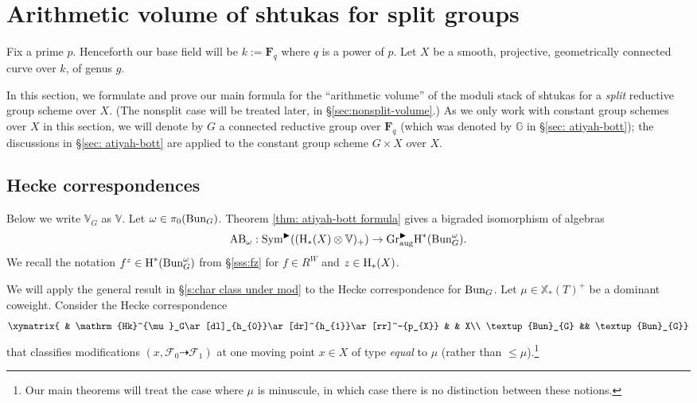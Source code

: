 \documentclass[reqno]{amsart}
\numberwithin{equation}{subsection}
\theoremstyle{definition}
\def\GG{\mathbb{G}}
\def\VV{\mathbb{V}}
\newcommand\cF{\mathcal{F}}
\newcommand{\Bun}{\textup{Bun}}
\newcommand{\Gr}{\textup{Gr}}
\newcommand\Hk{\mathrm{Hk}}
\newcommand\Sym{\textup{Sym}}
\newcommand\xcoch{\mathbb{X}_*}
\newcommand\ot{\otimes}
\newcommand{\homog}[2]{\textup{H}_{#1}({#2})}  %
\newcommand{\cohog}[2]{\textup{H}^{#1}({#2})}     %
\newcommand{\om}{\omega}
\newcommand\aug{\textup{aug}}
\newcommand\AB{\textup{AB}}
\newcommand\bl{\blacktriangleright}
\newcommand{\F}{\mathbf{F}}
\begin{document}
\section{Arithmetic volume of shtukas for split groups}\label{sec:split-arithmetic-volume}


Fix a prime $p$. Henceforth our base field will be $k := \F_q$ where $q$ is a power of $p$. Let $X$ be a smooth, projective, geometrically connected curve over $k$, of genus $g$. 

In this section, we formulate and prove our main formula for the ``arithmetic volume'' of the moduli stack of shtukas for a \emph{split} reductive group scheme over $X$. (The nonsplit case will be treated later, in \S \ref{sec:nonsplit-volume}.) As we only work with constant group schemes over $X$ in this section, we will denote by $G$ a connected reductive group over $\F_{q}$ (which was denoted by $\GG$ in \S\ref{sec: atiyah-bott}); the discussions in \S\ref{sec: atiyah-bott} are applied to the constant group scheme $G\times X$ over $X$.





\subsection{Hecke correspondences}

Below we write $\VV_G$ as $\VV$.
Let $\om\in \pi_{0}(\Bun_{G})$. Theorem \ref{thm: atiyah-bott formula} gives a bigraded isomorphism of algebras
\begin{equation}\label{eq: split AB}
\AB_{\om}: \Sym^{\bl}((\homog{*}{X}\ot \VV)_{+})\to\Gr^{\bl}_{\aug}\cohog{*}{\Bun^{\om}_{G}}.
\end{equation}
We recall the notation $f^{z}\in \cohog{*}{\Bun^{\om}_G}$ from \S\ref{sss:fz} for $f\in R^{W}$ and $z\in \homog{*}{X}$. 

We will apply the general result in \S\ref{s:char class under mod} to the Hecke correspondence for $\Bun_{G}$. Let $\mu \in \xcoch(T)^{+}$ be a dominant coweight. Consider the Hecke correspondence
\begin{equation*}
\xymatrix{ & \Hk^{\mu}_G\ar[dl]_{h_{0}}\ar[dr]^{h_{1}}\ar[rr]^-{p_{X}} & & X\\
\Bun_{G} && \Bun_{G}}
\end{equation*}
that classifies modifications $(x, \cF_{0}\dashrightarrow\cF_{1})$ at one moving point $x\in X$ of type \emph{equal} to $\mu$ (rather than $\le\mu$).\footnote{Our main theorems will treat the case where $\mu$ is minuscule, in which case there is no distinction between these notions.} 
\end{document}
